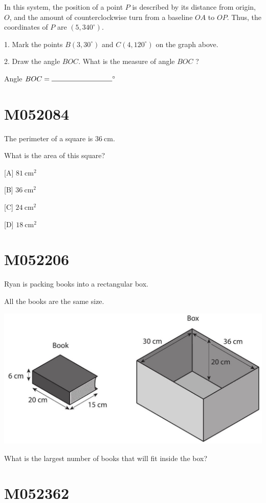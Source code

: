 \documentclass[12pt]{article}
\begin{document}
In this system, the position of a point $P$ is described by its distance from origin, $O$, and the amount of counterclockwise turn from a baseline $O A$ to $O P$. Thus, the coordinates of $P$ are $\left(5,340^{\circ}\right)$.

1. Mark the points $B\left(3,30^{\circ}\right)$ and $C\left(4,120^{\circ}\right)$ on the graph above.

2. Draw the angle $B O C$. What is the measure of angle $B O C$ ?

Angle $B O C=\rule{3cm}{0.15mm}^{\circ}$

\newpage
\section*{M052084}

The perimeter of a square is $36 \mathrm{~cm}$.

What is the area of this square?

[A] $81 \mathrm{~cm}^{2}$

[B] $36 \mathrm{~cm}^{2}$

[C] $24 \mathrm{~cm}^{2}$

[D] $18 \mathrm{~cm}^{2}$

\newpage
\section*{M052206}

Ryan is packing books into a rectangular box.

All the books are the same size.


\includegraphics[max width=\textwidth]{2024_02_20_828ebc9d68bcc1fbb223g-68}


What is the largest number of books that will fit inside the box?

\newpage
\section*{M052362}
\end{document}
